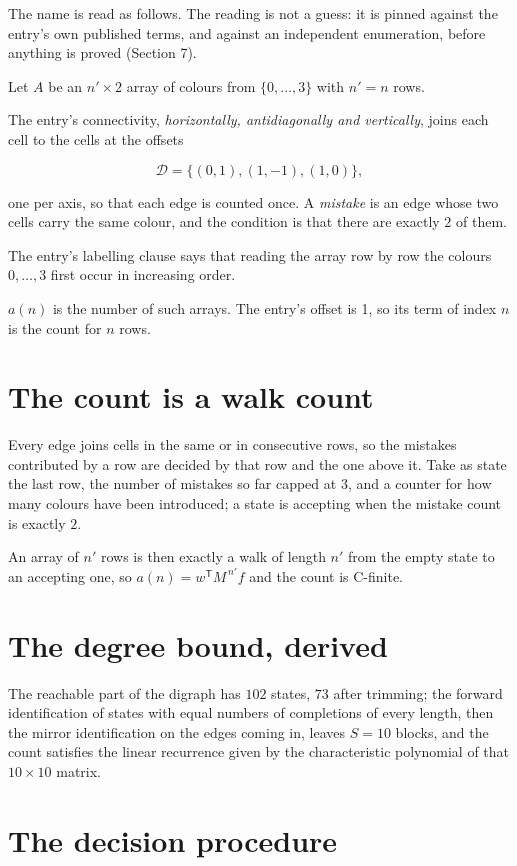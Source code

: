 \documentclass[11pt]{article}
\theoremstyle{definition}
\begin{document}
The name is read as follows. The reading is not a guess: it is pinned against the entry's own published terms, and against an independent enumeration, before anything is proved (Section 7).

Let $A$ be an $n' \times 2$ array of colours from $\{0,\dots,3\}$ with $n' = n$ rows.

The entry's connectivity, {\itshape horizontally, antidiagonally and vertically}, joins each cell to the cells at the offsets

\[\mathcal{D} = \{(0,1), (1,-1), (1,0)\},\]

one per axis, so that each edge is counted once. A {\itshape mistake} is an edge whose two cells carry the same colour, and the condition is that there are exactly $2$ of them.

The entry's labelling clause says that reading the array row by row the colours $0,\dots,3$ first occur in increasing order.

$a(n)$ is the number of such arrays. The entry's offset is 1, so its term of index $n$ is the count for $n$ rows.

\section{The count is a walk count}

Every edge joins cells in the same or in consecutive rows, so the mistakes contributed by a row are decided by that row and the one above it. Take as state the last row, the number of mistakes so far capped at $3$, and a counter for how many colours have been introduced; a state is accepting when the mistake count is exactly $2$.

An array of $n'$ rows is then exactly a walk of length $n'$ from the empty state to an accepting one, so $a(n) = w^{\mathsf T}M^{\,n'}f$ and the count is C-finite.

\section{The degree bound, derived}

The reachable part of the digraph has $102$ states, $73$ after trimming; the forward identification of states with equal numbers of completions of every length, then the mirror identification on the edges coming in, leaves $S = 10$ blocks, and the count satisfies the linear recurrence given by the characteristic polynomial of that $10\times10$ matrix.

\section{The decision procedure}
\end{document}
